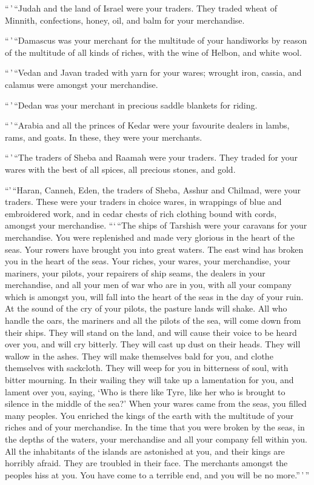  ``\,'\,``Judah and the land of Israel were your traders.
They traded wheat of Minnith, confections, honey, oil, and balm for your
merchandise.

 ``\,'\,``Damascus was your merchant for the multitude of
your handiworks by reason of the multitude of all kinds of riches, with
the wine of Helbon, and white wool.

 ``\,'\,``Vedan and Javan traded with yarn for your wares;
wrought iron, cassia, and calamus were amongst your merchandise.

 ``\,'\,``Dedan was your merchant in precious saddle
blankets for riding.

 ``\,'\,``Arabia and all the princes of Kedar were your
favourite dealers in lambs, rams, and goats. In these, they were your
merchants.

 ``\,'\,``The traders of Sheba and Raamah were your
traders. They traded for your wares with the best of all spices, all
precious stones, and gold.

 ``'\,``Haran, Canneh, Eden, the traders of Sheba, Asshur
and Chilmad, were your traders.  These were your traders in
choice wares, in wrappings of blue and embroidered work, and in cedar
chests of rich clothing bound with cords, amongst your merchandise.
 ```\,``The ships of Tarshish were your caravans for your
merchandise. You were replenished and made very glorious in the heart of
the seas.  Your rowers have brought you into great waters.
The east wind has broken you in the heart of the seas. 
Your riches, your wares, your merchandise, your mariners, your pilots,
your repairers of ship seams, the dealers in your merchandise, and all
your men of war who are in you, with all your company which is amongst
you, will fall into the heart of the seas in the day of your ruin.
 At the sound of the cry of your pilots, the pasture lands
will shake.  All who handle the oars, the mariners and all
the pilots of the sea, will come down from their ships. They will stand
on the land,  and will cause their voice to be heard over
you, and will cry bitterly. They will cast up dust on their heads. They
will wallow in the ashes.  They will make themselves bald
for you, and clothe themselves with sackcloth. They will weep for you in
bitterness of soul, with bitter mourning.  In their wailing
they will take up a lamentation for you, and lament over you, saying,
`Who is there like Tyre, like her who is brought to silence in the
middle of the sea?'  When your wares came from the seas,
you filled many peoples. You enriched the kings of the earth with the
multitude of your riches and of your merchandise.  In the
time that you were broken by the seas, in the depths of the waters, your
merchandise and all your company fell within you.  All the
inhabitants of the islands are astonished at you, and their kings are
horribly afraid. They are troubled in their face.  The
merchants amongst the peoples hiss at you. You have come to a terrible
end, and you will be no more.''\,'\,''

